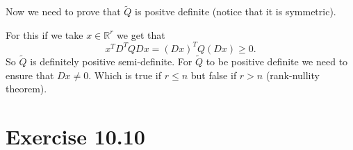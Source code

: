 \documentclass{article}
\begin{document}
Now we need to prove that $\tilde{Q}$ is positve definite (notice that it is symmetric).

For this if we take $x\in\mathbb{R}^r$ we get that
\[
	x^TD^TQDx=(Dx)^TQ(Dx)\geq 0.
\]
So $\tilde{Q}$ is definitely positive semi-definite. For $\tilde{Q}$ to be
positive definite we need to ensure that $Dx\neq 0$. Which is true if $r\leq n$
but false if $r>n$ (rank-nullity theorem).
\section*{Exercise 10.10}
\end{document}
